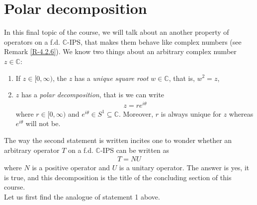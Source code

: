 \documentclass[letterpaper,11pt,twoside]{article}
\theoremstyle{definition}
\theoremstyle{definition}
\theoremstyle{definition}
\theoremstyle{definition}
\theoremstyle{definition}
\theoremstyle{definition}
\theoremstyle{remark}
\theoremstyle{definition}
\newcommand{\C}{\mathbb{C}}
\begin{document}
    \section{Polar decomposition}
    In this final topic of the course, we will talk about an another property of operators on a f.d. $ \C $-IPS, that makes them behave like complex numbers (see Remark \ref{R-4.2.6}). We know two things about an arbitrary complex number $ z\in \C $:
    \begin{enumerate}
    	\item {If $ z \in [0,\infty)$, the $ z $ has a\textit{ unique square root} $ w\in \C $, that is, $ w^{2} =z $,}
    	\item {$ z $ has a \textit{polar decomposition}, that is we can write 
    \begin{align*}
    	z = re^{i\theta}
    \end{align*}	
	where $ r\in [0,\infty) $ and $ e^{i\theta} \in S^{1}\subseteq \C$. Moreover, $ r $ is always unique for $ z $ whereas $ e^{i\theta} $ will not be.
    }
    \end{enumerate}
    	The way the second statement is written incites one to wonder whether an arbitrary operator $ T $ on a f.d. $ \C $-IPS can be written as 
    \begin{align*}
    	T = NU
    \end{align*}
    where $ N $ is a positive operator and $ U $ is a unitary operator. The answer is yes, it is true, and this decomposition is the title of the concluding section of this course.\\
    Let us first find the analogue of statement 1 above.
\end{document}
